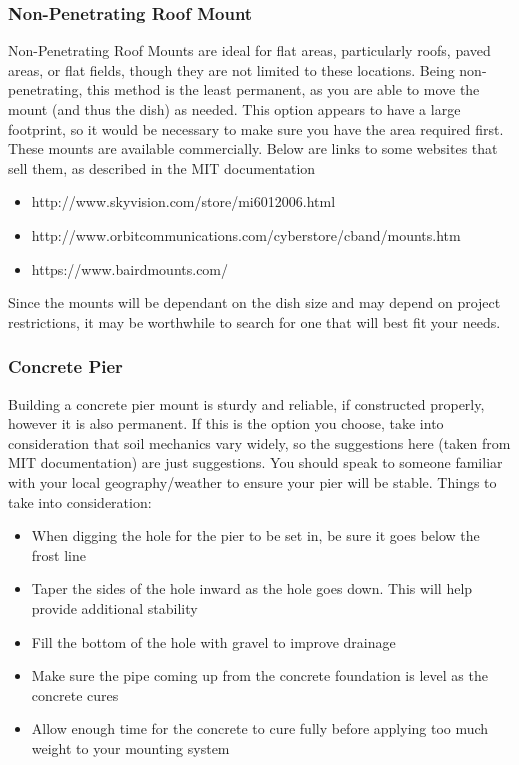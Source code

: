 \documentclass[11pt]{article} %
\begin{document}
\subsubsection{Non-Penetrating Roof Mount}

Non-Penetrating Roof Mounts are ideal for flat areas, particularly roofs, paved areas, or flat fields, though they are not limited to these locations. Being non-penetrating, this method is the least permanent, as you are able to move the mount (and thus the dish) as needed. This option appears to have a large footprint, so it would be necessary to make sure you have the area required first. These mounts are available commercially. Below are links to some websites that sell them, as described in the MIT documentation

\begin{itemize}
\item http://www.skyvision.com/store/mi6012006.html
\item http://www.orbitcommunications.com/cyberstore/cband/mounts.htm
\item https://www.bairdmounts.com/
\end{itemize}

Since the mounts will be dependant on the dish size and may depend on project restrictions, it may be worthwhile to search for one that will best fit your needs. 

\subsubsection{Concrete Pier}

Building a concrete pier mount is sturdy and reliable, if constructed properly, however it is also permanent. If this is the option you choose, take into consideration that soil mechanics vary widely, so the suggestions here (taken from MIT documentation) are just suggestions. You should speak to someone familiar with your local geography/weather to ensure your pier will be stable. Things to take into consideration:

\begin{itemize}
\item When digging the hole for the pier to be set in, be sure it goes below the frost line
\item Taper the sides of the hole inward as the hole goes down. This will help provide additional stability
\item Fill the bottom of the hole with gravel to improve drainage
\item Make sure the pipe coming up from the concrete foundation is level as the concrete cures
\item Allow enough time for the concrete to cure fully before applying too much weight to your mounting system
\end{itemize}
\end{document}
